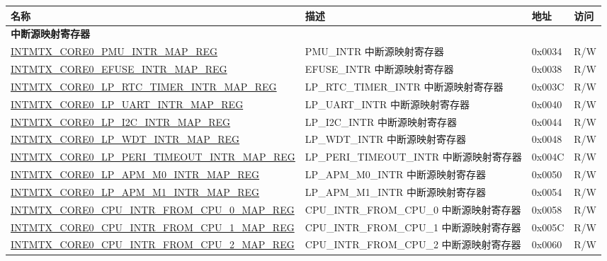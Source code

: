 \begin{longtable}{ | p{10cm} | m{10cm} | m{1.3cm} | m{1.0cm} | }
\hline\rowcolor{lightgray}
名称 & 描述 & 地址 & 访问 \\ \hline
\endhead
\multicolumn{4}{|l|}{\textbf{中断源映射寄存器}} \\ \hline
\hyperref[regdesc:INTMTXCORE0PMUINTRMAPREG]{INTMTX\_CORE0\_PMU\_INTR\_MAP\_REG} & PMU\_INTR 中断源映射寄存器 & 0x0034 & R/W \\ \hline
\hyperref[regdesc:INTMTXCORE0EFUSEINTRMAPREG]{INTMTX\_CORE0\_EFUSE\_INTR\_MAP\_REG} & EFUSE\_INTR 中断源映射寄存器 & 0x0038 & R/W \\ \hline
\hyperref[regdesc:INTMTXCORE0LPRTCTIMERINTRMAPREG]{INTMTX\_CORE0\_LP\_RTC\_TIMER\_INTR\_MAP\_REG} & LP\_RTC\_TIMER\_INTR 中断源映射寄存器 & 0x003C & R/W \\ \hline
\hyperref[regdesc:INTMTXCORE0LPUARTINTRMAPREG]{INTMTX\_CORE0\_LP\_UART\_INTR\_MAP\_REG} & LP\_UART\_INTR 中断源映射寄存器 & 0x0040 & R/W \\ \hline
\hyperref[regdesc:INTMTXCORE0LPI2CINTRMAPREG]{INTMTX\_CORE0\_LP\_I2C\_INTR\_MAP\_REG} & LP\_I2C\_INTR 中断源映射寄存器 & 0x0044 & R/W \\ \hline
\hyperref[regdesc:INTMTXCORE0LPWDTINTRMAPREG]{INTMTX\_CORE0\_LP\_WDT\_INTR\_MAP\_REG} & LP\_WDT\_INTR 中断源映射寄存器 & 0x0048 & R/W \\ \hline
\hyperref[regdesc:INTMTXCORE0LPPERITIMEOUTINTRMAPREG]{INTMTX\_CORE0\_LP\_PERI\_TIMEOUT\_INTR\_MAP\_REG} & LP\_PERI\_TIMEOUT\_INTR 中断源映射寄存器 & 0x004C & R/W \\ \hline
\hyperref[regdesc:INTMTXCORE0LPAPMM0INTRMAPREG]{INTMTX\_CORE0\_LP\_APM\_M0\_INTR\_MAP\_REG} & LP\_APM\_M0\_INTR 中断源映射寄存器 & 0x0050 & R/W \\ \hline
\hyperref[regdesc:INTMTXCORE0LPAPMM1INTRMAPREG]{INTMTX\_CORE0\_LP\_APM\_M1\_INTR\_MAP\_REG} & LP\_APM\_M1\_INTR 中断源映射寄存器 & 0x0054 & R/W \\ \hline
\hyperref[regdesc:INTMTXCORE0CPUINTRFROMCPU0MAPREG]{INTMTX\_CORE0\_CPU\_INTR\_FROM\_CPU\_0\_MAP\_REG} & CPU\_INTR\_FROM\_CPU\_0 中断源映射寄存器 & 0x0058 & R/W \\ \hline
\hyperref[regdesc:INTMTXCORE0CPUINTRFROMCPU1MAPREG]{INTMTX\_CORE0\_CPU\_INTR\_FROM\_CPU\_1\_MAP\_REG} & CPU\_INTR\_FROM\_CPU\_1 中断源映射寄存器 & 0x005C & R/W \\ \hline
\hyperref[regdesc:INTMTXCORE0CPUINTRFROMCPU2MAPREG]{INTMTX\_CORE0\_CPU\_INTR\_FROM\_CPU\_2\_MAP\_REG} & CPU\_INTR\_FROM\_CPU\_2 中断源映射寄存器 & 0x0060 & R/W \\ \hline

\end{longtable}
